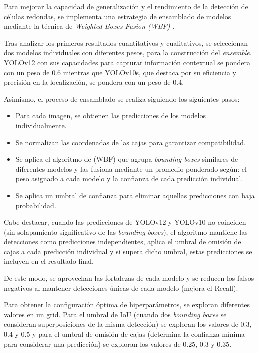 \documentclass[12pt,a4paper,onecolumn,oneside]{report}
\begin{document}
Para mejorar la capacidad de generalización y el rendimiento de la detección de células redondas, se implementa una estrategia de ensamblado de modelos mediante la técnica de \textit{Weighted Boxes Fusion (WBF)} \cite{repoTFM}. 

Tras analizar los primeros resultados cuantitativos y cualitativos, se seleccionan dos modelos individuales con diferentes pesos, para la construcción del \textit{ensemble}. YOLOv12 con sus capacidades 
para capturar información contextual se pondera con un peso de $0.6$ mientras que YOLOv10s, que destaca por su eficiencia y precisión en la localización, se pondera con un peso de $0.4$.

Asimismo, el proceso de ensamblado se realiza siguiendo los siguientes pasos:

\begin{itemize}
  \item Para cada imagen, se obtienen las predicciones de los modelos individualmente.
  \item Se normalizan las coordenadas de las cajas para garantizar compatibilidad.
  \item Se aplica el algoritmo de (WBF) que agrupa \textit{bounding boxes} similares de diferentes modelos y las fusiona mediante un promedio ponderado según: el peso asignado a cada modelo y la confianza de cada predicción individual.
  \item Se aplica un umbral de confianza para eliminar aquellas predicciones con baja probabilidad.
\end{itemize}

Cabe destacar, cuando las predicciones de YOLOv12 y YOLOv10 no coinciden (sin solapamiento significativo de las \textit{bounding boxes}), el algoritmo mantiene las detecciones como predicciones independientes,
aplica el umbral de omisión de cajas a cada predicción individual y si supera dicho umbral, estas predicciones se incluyen en el resultado final.

De este modo, se aprovechan las fortalezas de cada modelo y se reducen los falsos negativos al mantener detecciones únicas de cada modelo (mejora el Recall).

Para obtener la configuración óptima de hiperparámetros, se exploran diferentes valores en un grid. Para el umbral de IoU (cuando dos \textit{bounding boxes} se consideran superposiciones de la misma detección) se exploran los valores 
de 0.3, 0.4 y 0.5 y para el umbral de omisión de cajas (determina la confianza mínima para considerar una predicción) se exploran los valores de 0.25, 0.3 y 0.35.
\end{document}
